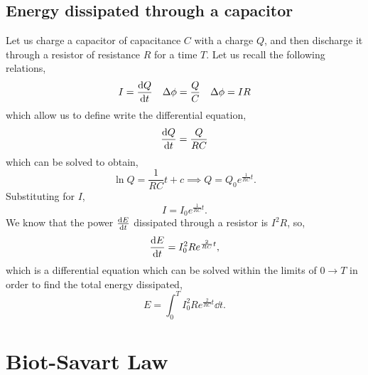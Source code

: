 \documentclass{book}
\begin{document}
\subsection{Energy dissipated through a capacitor}
Let us charge a capacitor of capacitance $C$ with a charge $Q$, and then discharge it through a resistor of resistance $R$ for a time $T$. Let us recall the following relations,
\begin{align}
    I = \dv{Q}{t} && \Delta\phi = \frac{Q}{C} && \Delta\phi = IR
\end{align}
which allow us to define write the differential equation,
\begin{equation}
    \dv{Q}{t} = \frac{Q}{RC}
\end{equation}
which can be solved to obtain,
\begin{equation}
    \ln{Q} = \frac{1}{RC}t + c \implies Q = Q_0e^{\frac{1}{RC}t}.
\end{equation}
Substituting for $I$,
\begin{equation}
    I = I_0e^{\frac{1}{RC}t}.
\end{equation}
We know that the power $\dv{E}{t}$ dissipated through a resistor is $I^2R$, so,
\begin{equation}
    \dv{E}{t} = I_0^2Re^{\frac{2}{RC}t},
\end{equation}
which is a differential equation which can be solved within the limits of $0\to T$ in order to find the total energy dissipated,
\begin{equation}
    E = \int_0^T I_0^2Re^{\frac{2}{RC}t}\dd{t}.
\end{equation}
\section{Biot-Savart Law}
\end{document}
